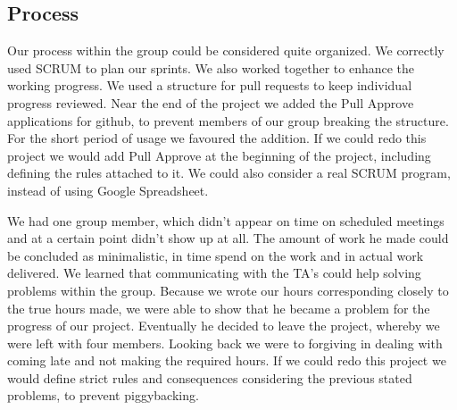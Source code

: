 

\subsection{Process}
Our process within the group could be considered quite organized. We correctly used SCRUM to plan our sprints. We also worked together to enhance the working progress. We used a structure for pull requests to keep individual progress reviewed. Near the end of the project we added the Pull Approve applications for github, to prevent members of our group breaking the structure. For the short period of usage we favoured the addition. If we could redo this project we would add Pull Approve at the beginning of the project, including defining the rules attached to it. We could also consider a real SCRUM program, instead of using Google Spreadsheet.



We had one group member, which didn't appear on time on scheduled meetings and at a certain point didn't show up at all. The amount of work he made could be concluded as minimalistic, in time spend on the work and in actual work delivered. We learned that communicating with the TA's could help solving problems within the group. Because we wrote our hours corresponding closely to the true hours made, we were able to show that he became a problem for the progress of our project. Eventually he decided to leave the project, whereby we were left with four members. Looking back we were to forgiving in dealing with coming late and not making the required hours. If we could redo this project we would define strict rules and consequences considering the previous stated problems, to prevent piggybacking.

